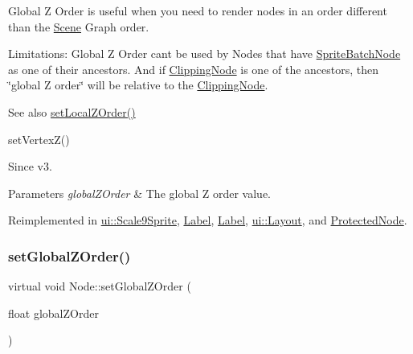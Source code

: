 Global Z Order is useful when you need to render nodes in an order different than the \hyperlink{classScene}{Scene} Graph order.

Limitations\+: Global Z Order can\textquotesingle{}t be used by Nodes that have \hyperlink{classSpriteBatchNode}{Sprite\+Batch\+Node} as one of their ancestors. And if \hyperlink{classClippingNode}{Clipping\+Node} is one of the ancestors, then \char`\"{}global Z order\char`\"{} will be relative to the \hyperlink{classClippingNode}{Clipping\+Node}.

\begin{DoxySeeAlso}{See also}
{\ttfamily \hyperlink{classNode_aee4e616c2d55b722226aae1e68b4946f}{set\+Local\+Z\+Order()}} 

{\ttfamily set\+Vertex\+Z()}
\end{DoxySeeAlso}
\begin{DoxySince}{Since}
v3.
\end{DoxySince}

\begin{DoxyParams}{Parameters}
{\em global\+Z\+Order} & The global Z order value. \\
\hline
\end{DoxyParams}


Reimplemented in \hyperlink{classui_1_1Scale9Sprite_a7347765b62bbd3f21677e25e1ca164a3}{ui\+::\+Scale9\+Sprite}, \hyperlink{classLabel_a8a3965a4546b01df9e3f1302c6ce62dc}{Label}, \hyperlink{classLabel_a0c53017f28f3e1f2c65f3ea7693a69b2}{Label}, \hyperlink{classui_1_1Layout_a5ac5023a3f35c0ba03769ef6794c8537}{ui\+::\+Layout}, and \hyperlink{classProtectedNode_a0d067b9056a934255c7a44a675dc9e92}{Protected\+Node}.

\mbox{\label{classNode_aad45bcba0411770b5ef88f5409d06bb2}} 
\subsubsection{\texorpdfstring{set\+Global\+Z\+Order()}{setGlobalZOrder()}\hspace{0.1cm}{\footnotesize\ttfamily [2/2]}}
{\footnotesize\ttfamily virtual void Node\+::set\+Global\+Z\+Order (\begin{DoxyParamCaption}\item[{float}]{global\+Z\+Order }\end{DoxyParamCaption})\hspace{0.3cm}{\ttfamily [virtual]}}

